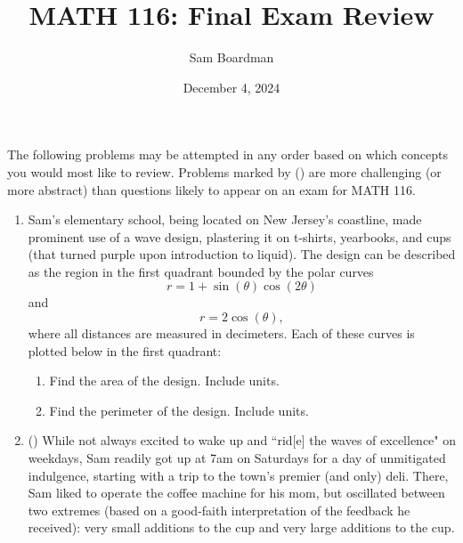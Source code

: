 \documentclass{article}
\title{MATH 116: Final Exam Review}
\author{Sam Boardman}
\date{December 4, 2024}
\begin{document}
\maketitle

The following problems may be attempted in any order based on which concepts you would most like to review. Problems marked by (\textasteriskcentered{}) are more challenging (or more abstract) than questions likely to appear on an exam for MATH 116.   

\begin{enumerate}

\item Sam's elementary school, being located on New Jersey's coastline, made prominent use of a wave design, plastering it on t-shirts, yearbooks, and cups (that turned purple upon introduction to liquid). The design can be described as the region in the first quadrant bounded by the polar curves $$r = 1 + \sin(\theta)\cos(2\theta)$$ and $$r = 2\cos(\theta),$$ where all distances are measured in decimeters. Each of these curves is plotted below in the first quadrant:

\begin{center}
  \end{center}

\begin{enumerate}
    \item Find the area of the design. Include units.

    \vfill
    
    \item Find the perimeter of the design. Include units. 

    \vfill 
\end{enumerate}

\newpage

\item (\textasteriskcentered{}) While not always excited to wake up and ``rid[e] the waves of excellence" on weekdays, Sam readily got up at 7am on Saturdays for a day of unmitigated indulgence, starting with a trip to the town's premier (and only) deli. There, Sam liked to operate the coffee machine for his mom, but oscillated between two extremes (based on a good-faith interpretation of the feedback he received): very small additions to the cup and very large additions to the cup. \\


\end{enumerate}
\end{document}

